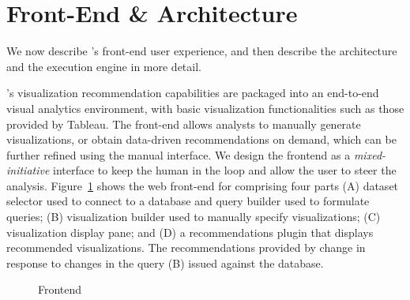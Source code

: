
\section{{\large \SeeDB} Front-End \& Architecture}
\label{sec:system_architecture}


We now describe \SeeDB's front-end user experience, and then
describe the architecture and the execution engine in more detail.

\SeeDB's visualization recommendation capabilities
are packaged into an end-to-end visual analytics environment, 
with basic visualization functionalities such as those provided by Tableau.
The \SeeDB front-end allows analysts to manually
generate visualizations, or
obtain data-driven recommendations on demand, which can be further
refined using the manual interface.
We design the frontend as a {\it mixed-initiative} interface to
keep the human in the loop and allow the user to steer the analysis.
Figure~\ref{fig:frontend1} shows the web front-end for \SeeDB 
comprising four parts 
(A) dataset selector used to connect to a database and query builder used to
formulate queries; 
(B) visualization builder used to manually specify visualizations; 
(C) visualization display pane; and 
(D) a recommendations plugin 
that displays recommended visualizations.
The recommendations provided by \SeeDB change in 
response to changes in the query (B)
issued against the database.

\begin{figure}[htb]
\centerline{
\hbox{}}
\caption{\SeeDB Frontend}
\vspace{-12pt}
\label{fig:frontend1}
\end{figure} 


